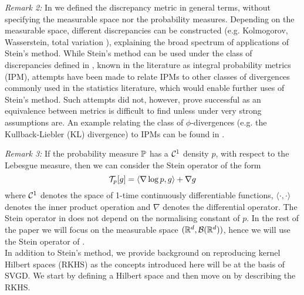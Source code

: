 \emph{Remark 2:} In  we defined the discrepancy metric in general terms, without specifying the measurable space nor the probability measures. Depending on the measurable space, different discrepancies can be constructed (e.g. Kolmogorov, Wasserstein, total variation \cite{ross2011fundamentals}), explaining the broad spectrum of applications of Stein's method. While Stein's method can be used under the class of discrepancies defined in , known in the literature as integral probability metrics (IPM), attempts have been made to relate IPMs to other classes of divergences commonly used in the statistics literature, which would enable further uses of Stein's method. Such attempts did not, however, prove successful as an equivalence between metrics is difficult to find unless under very strong assumptions are. An example relating the class of $\phi$-divergences (e.g. the Kullback-Liebler (KL) divergence) to IPMs can be found in \cite{sriperumbudur2009integral}.

\emph{Remark 3:} If the probability measure $\mathbb{P}$ has a $\mathcal{C}^1$ density $p$, with respect to the Lebesgue measure, then we can consider the Stein operator of the form 
\begin{equation}\label{score_function}
\mathcal{T}_{p}[g] = \langle \nabla \log p, g \rangle + \nabla g
\end{equation}
where $\mathcal{C}^1$ denotes the space of 1-time continuously differentiable functions, $\langle \cdot, \cdot \rangle$ denotes the inner product operation and $\nabla$ denotes the differential operator. The Stein operator in  does not depend on the normalising constant of $p$. In the rest of the paper we will focus on the measurable space $(\mathbb{R}^d, \mathcal{B}(\mathbb{R}^d))$, hence we will use the Stein operator of .
\\

\noindent In addition to Stein's method, we provide background on reproducing kernel Hilbert spaces (RKHS) as the concepts introduced here will be at the basis of SVGD. We start by defining a Hilbert space and then move on by describing the RKHS.

